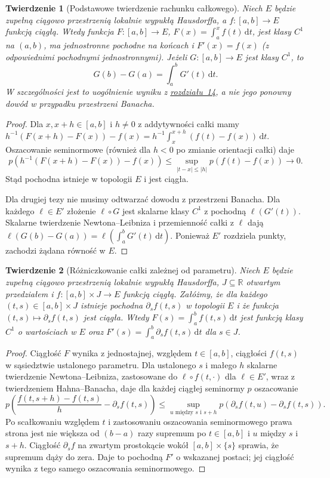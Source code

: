 \documentclass[11pt,a4paper]{article}
\numberwithin{equation}{section}
\theoremstyle{plain}
\newtheorem{twierdzenie}{Twierdzenie}[section]
\theoremstyle{definition}
\theoremstyle{remark}
\newcommand{\R}{\mathbb R}
\begin{document}
\begin{twierdzenie}[Podstawowe twierdzenie rachunku całkowego]
\label{thm:ftc-lcs15a}
Niech $E$ będzie zupełną ciągowo przestrzenią lokalnie wypukłą
Hausdorffa, a $f:[a,b]\to E$ funkcją ciągłą. Wtedy funkcja
$F:[a,b]\to E$, $F(x)=\int_a^x f(t)\,\mathrm dt$, jest klasy
$C^1$ na $(a,b)$, ma jednostronne pochodne na końcach i
$F'(x)=f(x)$ (z odpowiednimi pochodnymi jednostronnymi).
Jeżeli $G:[a,b]\to E$ jest klasy $C^1$, to
\[
 G(b)-G(a)=\int_a^b G'(t)\,\mathrm dt.
\]
W szczególności jest to uogólnienie wyniku z \hyperref[sec:gateaux-frechet14]{rozdziału~14},
a nie jego ponowny dowód w przypadku przestrzeni Banacha.
\end{twierdzenie}
\begin{proof}
Dla $x,x+h\in[a,b]$ i $h\ne0$ z addytywności całki mamy
$h^{-1}(F(x+h)-F(x))-f(x)
=h^{-1}\int_x^{x+h}(f(t)-f(x))\,\mathrm dt$.
Oszacowanie seminormowe (również dla $h<0$ po zmianie
orientacji całki) daje
\[
 p\left(h^{-1}(F(x+h)-F(x))-f(x)\right)
 \le\sup_{|t-x|\le|h|}p(f(t)-f(x))\longrightarrow0.
\]
Stąd pochodna istnieje w topologii $E$ i jest ciągła.

Dla drugiej tezy nie musimy odtwarzać dowodu z przestrzeni Banacha.
Dla każdego $\ell\in E'$ złożenie $\ell\circ G$ jest skalarne
klasy $C^1$ z pochodną $\ell(G'(t))$. Skalarne twierdzenie
Newtona--Leibniza i przemienność całki z $\ell$ dają
$\ell(G(b)-G(a))=\ell(\int_a^b G'(t)\,\mathrm dt)$.
Ponieważ $E'$ rozdziela punkty, zachodzi żądana równość w $E$.
\end{proof}

\begin{twierdzenie}[Różniczkowanie całki zależnej od parametru]
\label{thm:parametric-integral15a}
Niech $E$ będzie zupełną ciągowo przestrzenią lokalnie wypukłą
Hausdorffa, $J\subseteq\R$ otwartym przedziałem i
$f:[a,b]\times J\to E$ funkcją ciągłą. Załóżmy, że dla
każdego $(t,s)\in[a,b]\times J$ istnieje pochodna
$\partial_s f(t,s)$ w topologii $E$ i że funkcja
$(t,s)\mapsto\partial_s f(t,s)$ jest ciągła.
Wtedy $F(s)=\int_a^b f(t,s)\,\mathrm dt$ jest funkcją klasy $C^1$
o wartościach w $E$ oraz
$F'(s)=\int_a^b\partial_s f(t,s)\,\mathrm dt$ dla $s\in J$.
\end{twierdzenie}
\begin{proof}
Ciągłość $F$ wynika z jednostajnej, względem $t\in[a,b]$,
ciągłości $f(t,s)$ w sąsiedztwie ustalonego parametru.
Dla ustalonego $s$ i małego $h$ skalarne twierdzenie
Newtona--Leibniza, zastosowane do $\ell\circ f(t,\cdot)$ dla
$\ell\in E'$, wraz z twierdzeniem Hahna--Banacha, daje dla
każdej ciągłej seminormy $p$ oszacowanie
\[
 p\left(\frac{f(t,s+h)-f(t,s)}h-\partial_s f(t,s)\right)
 \le\sup_{u\text{ między }s\text{ i }s+h}
 p(\partial_s f(t,u)-\partial_s f(t,s)).
\]
Po scałkowaniu względem $t$ i zastosowaniu oszacowania
seminormowego prawa strona jest nie większa od
$(b-a)$ razy supremum po $t\in[a,b]$ i $u$ między $s$ i $s+h$.
Ciągłość $\partial_s f$ na zwartym prostokącie wokół
$[a,b]\times\{s\}$ sprawia, że supremum dąży do zera.
Daje to pochodną $F'$ o wskazanej postaci; jej ciągłość
wynika z tego samego oszacowania seminormowego.
\end{proof}
\end{document}
